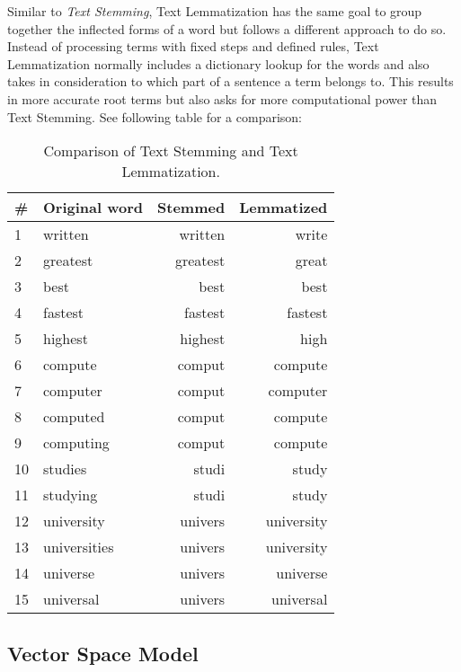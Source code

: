 Similar to \textit{Text Stemming}, Text Lemmatization has the same goal to group together the inflected forms of a word
but follows a different approach to do so.
Instead of processing terms with fixed steps and defined rules,
Text Lemmatization normally includes a dictionary lookup for the words
and also takes in consideration to which part of a sentence a term belongs to.
This results in more accurate root terms but also asks for more computational power than Text Stemming.
See following table for a comparison:

\begin{table}[h]
    \centering
    \begin{tabular}{|l|l|r|r|}
    \hline
    \textbf{\#} & \textbf{Original word} & \textbf{Stemmed} & \textbf{Lemmatized} \\ \hline
    1 & written & written & write \\ \hline
    2 & greatest & greatest & great \\ \hline
    3 & best & best & best \\ \hline
    4 & fastest & fastest & fastest \\ \hline
    5 & highest & highest & high \\ \hline
    6 & compute & comput & compute \\ \hline
    7 & computer & comput & computer \\ \hline
    8 & computed & comput & compute \\ \hline
    9 & computing & comput & compute \\ \hline
    10 & studies & studi & study \\ \hline
    11 & studying & studi & study \\ \hline
    12 & university & univers & university \\ \hline
    13 & universities & univers & university \\ \hline
    14 & universe & univers & universe \\ \hline
    15 & universal & univers & universal \\ \hline
    \end{tabular}
    \caption{Comparison of Text Stemming and Text Lemmatization.}
    \label{tab:comparison_stemming_lemmatization}
\end{table}


\subsection{Vector Space Model}
\label{subsec:3_vector_space_model}

